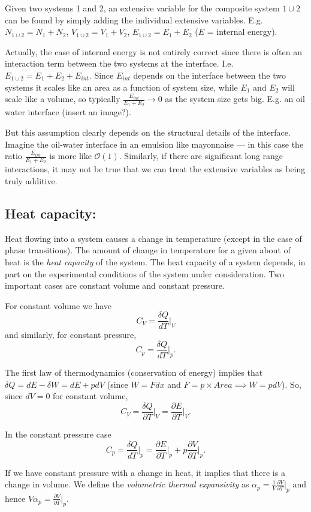 Given two systems 1 and 2, an extensive variable for the composite system $1\cup2$ can be found by simply adding the individual extensive variables. E.g. $N_{1\cup2} = N_1 + N_2$, $V_{1\cup2} = V_1 + V_2$, $E_{1\cup2} = E_1 + E_2$ ($E$ = internal energy).

Actually, the case of internal energy is not entirely correct since there is often an interaction term between the two systems at the interface. I.e. $E_{1\cup2} = E_1+E_2+E_{int}$. Since $E_{int}$ depends on the interface between the two systems it scales like an area as a function of system size, while $E_1$ and $E_2$ will scale like a volume, so typically $\frac{E_{int}}{E_1+E_2}\rightarrow0$ as the system size gets big. E.g. an oil water interface (insert an image?).

But this assumption clearly depends on the structural details of the interface. Imagine the oil-water interface in an emulsion like mayonnaise --- in this case the ratio  $\frac{E_{int}}{E_1+E_2}$ is more like $\mathcal{O}(1)$.
Similarly, if there are significant long range interactions, it may not be true that we can treat the extensive variables as being truly additive.

\subsection{Heat capacity:}
Heat flowing into a system causes a change in temperature (except in the case of phase transitions). The amount of change in temperature for a given about of heat is the \emph{heat capacity} of the system. The heat capacity of a system depends, in part on the experimental conditions of the system under consideration. Two important cases are constant volume and constant pressure.

For constant volume we have
$$C_V = \frac{\delta Q}{dT}\bigg\vert_V$$
and similarly, for constant pressure,
$$C_p = \frac{\delta Q}{dT}\bigg\vert_p.$$

The first law of thermodynamics (conservation of energy) implies that $\delta Q = dE - \delta W = dE + pdV$  (since $W = Fdx$ and $F=p\times Area \implies W = pdV$). So, since $dV=0$ for constant volume,
$$
	C_V = \frac{\delta Q}{\partial T}\bigg\vert_{V} = \frac{\partial E}{\partial T}\bigg\vert_{V}.
$$


In the constant pressure case 
$$
	C_p = \frac{\delta Q}{dT}\vert_{p} = \frac{\partial E}{\partial T}\vert_{p} + p\frac{\partial V}{\partial T}\vert_{p}.
$$

If we have constant pressure with a change in heat, it implies that there is a change in volume. We define the \emph{volumetric thermal expansivity} as $\alpha_p = \frac{1}{V}\frac{\partial V}{\partial T}\vert_{p}$ and hence $V\alpha_p =\frac{\partial V}{\partial T}\vert_{p}$.

